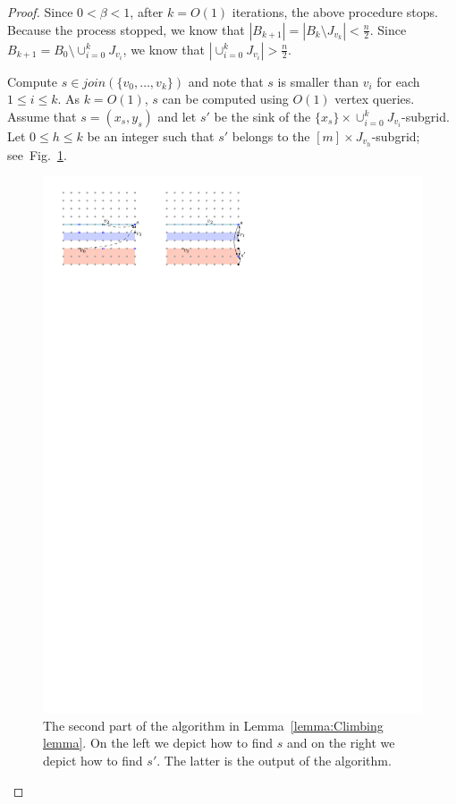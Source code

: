 \documentclass[runningheads,a4paper]{llncs}
\begin{document}
\begin{proof}
Since $0 < \beta < 1$, after $k = O(1)$ iterations, the above procedure stops. 
Because the process stopped, we know that $|B_{k+1}| = |B_k \setminus J_{v_k}| <  \frac{n}{2}$.
Since $B_{k+1} = B_0\setminus \cup_{i=0}^k J_{v_i}$, we know that $|\cup_{i=0}^k J_{v_i}| >  \frac{n}{2}$.

Compute $s \in join(\{v_0, \ldots, v_k\})$ and note that $s$ is smaller than $v_i$ for each $1\leq i\leq k$. As $k = O(1)$, $s$ can be computed using $O(1)$ vertex queries. 
Assume that $s = (x_s, y_s)$ and let $s'$ be the sink of the $\{x_s\}\times \cup_{i=0}^k J_{v_i}$-subgrid. 
Let $0\leq h\leq k$ be an integer such that $s'$ belongs to the $[m]\times J_{v_h}$-subgrid; see~Fig.~\ref{fig:Climbing Lemma-2}.

\begin{figure}[t]
\centering
\includegraphics{ClimbingLemma-2.pdf}
\caption{\small The second part of the algorithm in Lemma~\ref{lemma:Climbing lemma}. On the left we depict how to find $s$ and on the right we depict how to find $s'$. The latter is the output of the algorithm.}
\label{fig:Climbing Lemma-2}
\end{figure}


\end{proof}
\end{document}
